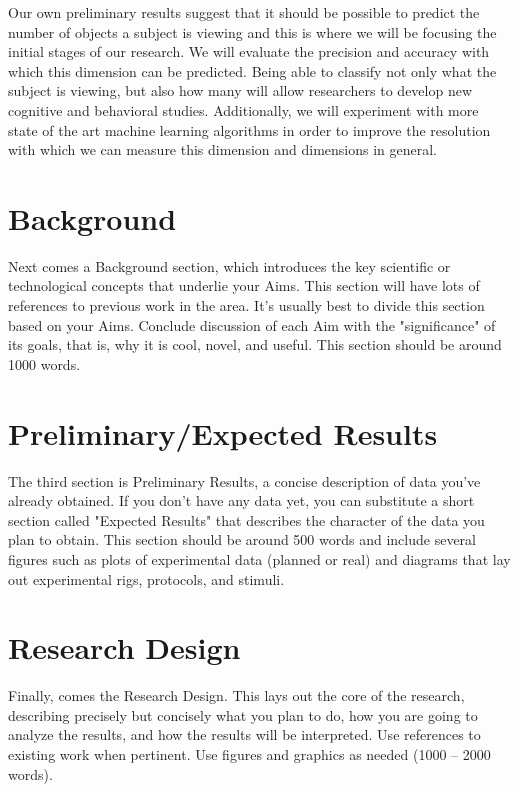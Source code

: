 \documentclass[12pt]{article}
\begin{document}
Our own preliminary results suggest that it should be possible to predict the number of objects a subject is viewing and this is where we will be focusing the initial stages of our research.
We will evaluate the precision and accuracy with which this dimension can be predicted.
Being able to classify not only what the subject is viewing, but also how many will allow researchers to develop new cognitive and behavioral studies. 
Additionally, we will experiment with more state of the art machine learning algorithms in order to improve the resolution with which we can measure this dimension and dimensions in general.

\section{Background}
Next comes a Background section, which introduces the key scientific or technological concepts that underlie your Aims. 
This section will have lots of references to previous work in the area. 
It's usually best to divide this section based on your Aims. 
Conclude discussion of each Aim with the "significance" of its goals, that is, why it is cool, novel, and useful. 
This section should be around 1000 words.



\section{Preliminary/Expected Results}
The third section is Preliminary Results, a concise description of data you've already obtained. 
If you don't have any data yet, you can substitute a short section called "Expected Results" that describes the character of the data you plan to obtain. 
This section should be around 500 words and include several figures such as plots of experimental data (planned or real) and diagrams that lay out experimental rigs, protocols, and stimuli.

\section{Research Design}
Finally, comes the Research Design. 
This lays out the core of the research, describing precisely but concisely what you plan to do, how you are going to analyze the results, and how the results will be interpreted. 
Use references to existing work when pertinent. 
Use figures and graphics as needed (1000 – 2000 words).


\end{document}
